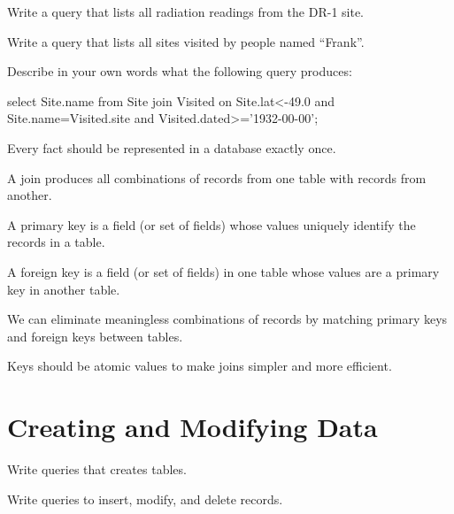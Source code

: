 \documentclass{book}
\begin{document}
\begin{challenge}
  Write a query that lists all radiation readings from the DR-1 site.
\end{challenge}

\begin{challenge}
  Write a query that lists all sites visited by people named ``Frank''.
\end{challenge}

\begin{challenge}
  Describe in your own words what the following query produces:

\begin{VerbIn}
select Site.name from Site join Visited
on Site.lat<-49.0 and Site.name=Visited.site and Visited.dated>='1932-00-00';
\end{VerbIn}
\end{challenge}

\begin{keypoints}
\begin{swcitemize}
\item
  Every fact should be represented in a database exactly once.
\item
  A join produces all combinations of records from one table with
  records from another.
\item
  A primary key is a field (or set of fields) whose values uniquely
  identify the records in a table.
\item
  A foreign key is a field (or set of fields) in one table whose values
  are a primary key in another table.
\item
  We can eliminate meaningless combinations of records by matching
  primary keys and foreign keys between tables.
\item
  Keys should be atomic values to make joins simpler and more efficient.
\end{swcitemize}
\end{keypoints}

\section{Creating and Modifying Data}

\begin{objectives}
\begin{swcitemize}
\item
  Write queries that creates tables.
\item
  Write queries to insert, modify, and delete records.
\end{swcitemize}
\end{objectives}
\end{document}
